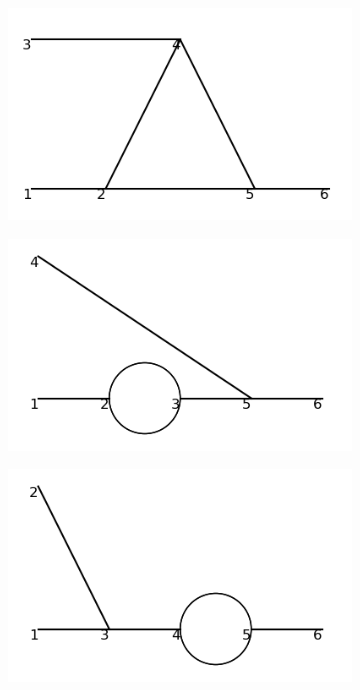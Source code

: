 \documentclass[11pt,a4paper,twoside,pdf]{article}
\numberwithin{equation}{section}
\begin{document}
\begin{figure}[h!]
    \centering
    \begin{subfigure}[t]{0.24\textwidth}
        \centering
        \includegraphics[width=\textwidth]{plots/order3/order3_1to2/1.png}
        \caption{ }
    \end{subfigure}%
    \hfill
    \begin{subfigure}[t]{0.24\textwidth}
        \centering
        \includegraphics[width=\textwidth]{plots/order3/order3_1to2/2.png}
        \caption{ }
    \end{subfigure}
    \hfill
    \begin{subfigure}[t]{0.24\textwidth}
        \centering
        \includegraphics[width=\textwidth]{plots/order3/order3_1to2/3.png}

\end{subfigure}
\end{figure}
\end{document}
